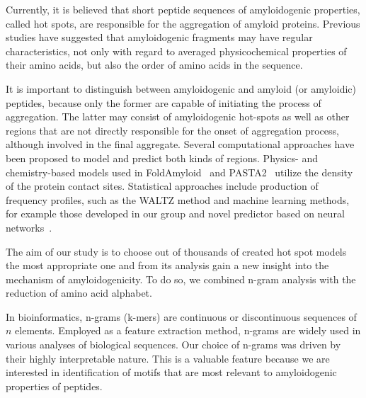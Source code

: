 \documentclass[fleqn,10pt,twoside]{gcb15submission}
\begin{document}
  Currently, it is believed that short peptide sequences of amyloidogenic 
properties, called hot spots, are responsible for the aggregation of amyloid 
proteins. Previous studies have suggested that amyloidogenic fragments may have 
regular characteristics, not only with regard to averaged physicochemical 
properties of their amino acids, but also the order of amino acids in the 
sequence. 

  It is important to distinguish between amyloidogenic and amyloid (or 
amyloidic) peptides, because only the former are capable of initiating the 
process of aggregation. The latter may consist of amyloidogenic hot-spots as 
well as other regions that are not directly responsible for the onset of 
aggregation process, although involved in the final aggregate. Several 
computational approaches have been proposed to model and predict both kinds of 
regions. Physics- and chemistry-based models used in  
FoldAmyloid~\citep{garbuzynskiy_foldamyloid:_2010} and 
PASTA2~\citep{walsh_pasta_2014} utilize the density of the 
protein contact sites. 
Statistical approaches include production of frequency profiles, such as the 
WALTZ method 
\citep{maurer-stroh_exploring_2010} and machine learning methods, for example 
those 
developed in our group \citep{stanislawski_machine_2013, gasior_fish_2014} and
novel predictor based on neural networks~\citep{familia_prediction_2015}. 


%
%
%
  The aim of our study is to choose out of thousands of created hot spot 
models the most appropriate one and from its analysis gain a new insight into the 
mechanism of amyloidogenicity. To do so, we combined n-gram analysis with the
reduction of amino acid alphabet.
  
  In bioinformatics, n-grams (k-mers) are continuous or discontinuous sequences 
of $n$ elements. Employed as a feature extraction method, n-grams are widely 
used in various analyses of biological sequences. Our choice of n-grams was driven by 
their highly interpretable nature. This is a valuable feature because we are 
interested in identification of motifs that are most relevant to amyloidogenic 
properties of peptides.
\end{document}

